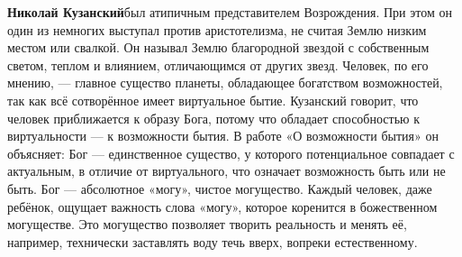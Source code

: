 
\textbf{Николай Кузанский}был атипичным представителем Возрождения. При этом он один из немногих выступал против аристотелизма, не считая Землю низким местом или свалкой. Он называл Землю благородной звездой с собственным светом, теплом и влиянием, отличающимся от других звезд. Человек, по его мнению, --- главное существо планеты, обладающее богатством возможностей, так как всё сотворённое имеет виртуальное бытие.
Кузанский говорит, что человек приближается к образу Бога, потому что обладает способностью к виртуальности --- к возможности бытия. В работе «О возможности бытия» он объясняет: Бог --- единственное существо, у которого потенциальное совпадает с актуальным, в отличие от виртуального, что означает возможность быть или не быть. Бог --- абсолютное «могу», чистое могущество. Каждый человек, даже ребёнок, ощущает важность слова «могу», которое коренится в божественном могуществе. Это могущество позволяет творить реальность и менять её, например, технически заставлять воду течь вверх, вопреки естественному.

